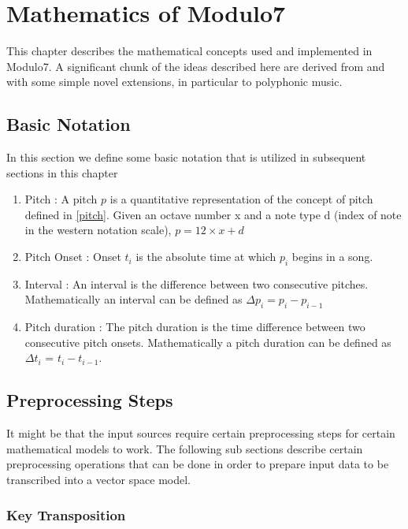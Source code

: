 \chapter{Mathematics of Modulo7}
\label{sec:mir math}

\noindent This chapter describes the mathematical concepts used and implemented in Modulo7. A significant chunk of the ideas described here are derived from \cite{similie} and \cite{similietechnicalmanual} with some simple novel extensions, in particular to polyphonic music. 

\section{Basic Notation} \label{basicnotation}

\noindent In this section we define some basic notation that is utilized in subsequent sections in this chapter

\begin{enumerate}
\item Pitch : A pitch $p$ is a quantitative representation of the concept of pitch defined in \ref{pitch}. Given an octave number x and a note type d (index of note in the western notation scale), $p = 12 \times x + d$  
\item Pitch Onset : Onset $t_i$ is the absolute time at which $p_i$ begins in a song. 
\item Interval : An interval is the difference between two consecutive pitches. Mathematically an interval can be defined as $\Delta p_i = p_i - p_{i-1}$
\item Pitch duration : The pitch duration is the time difference between two consecutive pitch onsets. Mathematically a pitch duration can be defined as $\Delta t_i$ = $t_i - t_{i-1}$. 
\end{enumerate}

\section{Preprocessing Steps} \label{sim:preprocess}

\noindent It might be that the input sources require certain preprocessing steps for certain mathematical models to work. The following sub sections describe certain preprocessing operations that can be done in order to prepare input data to be transcribed into a vector space model. 

\subsection{Key Transposition} \label{tonalityalignment}

